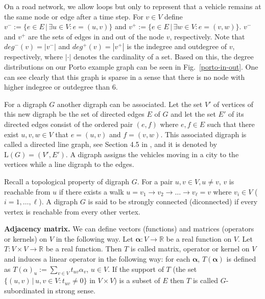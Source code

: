 \documentclass[b5paper,12pt]{report}
\theoremstyle{definition}
\newcommand{\balpha}{\boldsymbol{\alpha}}
\begin{document}
On a road network, we allow loops but only to represent that a vehicle remains at the same node or edge after a time step. For $v \in V$ define $v^{−} := \{e \in E\, |\, \exists u \in V : e = (u, v)\}$ and $v^{+} := \{e \in E \,|\, \exists w \in V : e = (v, w)\}$. $v^{−}$ and $v^{+}$ are the sets of edges in and out of the node $v$, respectively. Note that $deg^{−}(v) = |v^{−}|$ and $deg^{+}(v) = |v^{+}|$ is the indegree and outdegree of $v$, respectively, where $|\cdot|$ denotes the cardinality of a set. Based on this, the degree distributions on our Porto example graph can be seen in Fig.~\ref{porto-in-out}. One can see clearly that this graph is sparse in a sense that there is no node with higher indegree or outdegree than 6.

For a digraph $G$ another digraph can be associated. Let the set $V'$ of vertices of this new digraph be the set of directed edges $E$ of $G$ and let the set $E'$ of its directed edges consist of the ordered pair $(e, f)$ where $e, f \in E$ such that there exist $u, v, w \in V$ that $e = (u, v)$ and $f = (v, w)$. This associated digraph is called a directed line graph, see Section 4.5 in \cite{JensenGutin2007}, and it is denoted by $\text{L}(G) = (V', E')$. A digraph assigns the vehicles moving in a city to the vertices while a line digraph to the edges.

Recall a topological property of digraph $G$. For a pair $u, v \in V, u \neq v$, $v$ is reachable from $u$ if there exists a walk $u =v_1 \rightarrow v_2 \rightarrow \dots \rightarrow v_\ell =v$ where $v_i\in V$ ($i=1,\ldots,\ell$). A digraph $G$ is said to be strongly connected (diconnected) if every vertex is reachable from every other vertex.

\smallskip

\textbf{Adjacency matrix.} We can define vectors (functions) and matrices (operators or kernels) on $V$ in the following way. Let $\balpha: V\to \mathbb{R}$ be a real function on $V$. Let $T:V\times V\to \mathbb{R}$ be a real function. Then $T$ is called matrix, operator or kernel on $V$ and induces a linear operator in the following way: for each $\balpha$, $T(\balpha)$ is defined as $T(\alpha)_u := \sum_{v\in V} t_{uv} \alpha_v$, $u\in V$. If the support of $T$ (the set $\{(u,v)\,|\, u,v\in V: t_{uv}\neq 0\}$ in $V\times V$) is a subset of $E$ then $T$ is called $G$-subordinated in strong sense. 
\end{document}
